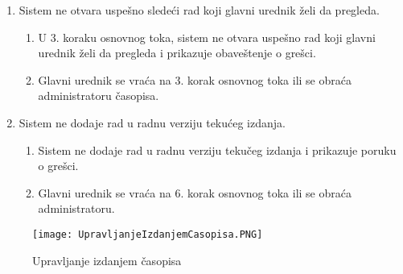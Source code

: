 \documentclass[a4paper]{article}
\begin{document}
\begin{itemize}
\begin{enumerate}
            \item Sistem ne otvara uspešno sledeći rad koji glavni urednik želi da pregleda.
                \begin{enumerate}
                    \item U 3. koraku osnovnog toka, sistem ne otvara uspešno rad koji glavni urednik želi da pregleda i prikazuje obaveštenje o grešci.
                    \item Glavni urednik se vraća na 3. korak osnovnog toka ili se obraća administratoru časopisa.
                \end{enumerate}
            \item Sistem ne dodaje rad u radnu verziju tekućeg izdanja.
            \begin{enumerate}
                \item Sistem ne dodaje rad u radnu verziju tekučeg izdanja i prikazuje poruku o grešci.
                \item Glavni urednik se vraća na 6. korak osnovnog toka ili se obraća administratoru.
            \end{enumerate}
        \end{enumerate}
\end{itemize}

\begin{figure}[hbt!]
    \centering
    \texttt{[image: UpravljanjeIzdanjemCasopisa.PNG]}
    \caption{Upravljanje izdanjem časopisa}
    \label{fig:my_label}
\end{figure}
\end{document}
